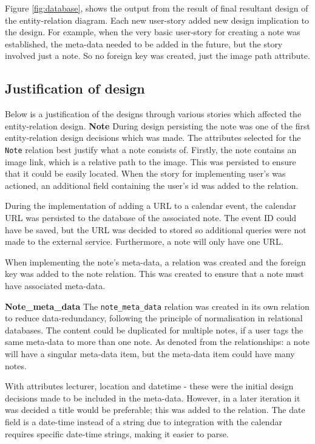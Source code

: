 Figure \ref{fig:database}, shows the output from the result of final resultant design of the entity-relation diagram. Each new user-story added new design implication to the design. For example, when the very basic user-story for creating a note was established, the meta-data needed to be added in the future, but the story involved just a note. So no foreign key was created, just the image path attribute.

\subsection{Justification of design}
Below is a justification of the designs through various stories which affected the entity-relation design.
\noindent
\textbf{Note}
\newline
During design persisting the note was one of the first entity-relation design decisions which was made. The attributes selected for the \texttt{Note} relation best justify what a note consists of. Firstly, the note contains an image link, which is a relative path to the image. This was persisted to ensure that it could be easily located. When the story for implementing user's was actioned, an additional field containing the user's id was added to the relation.

During the implementation of adding a URL to a calendar event, the calendar URL was persisted to the database of the associated note. The event ID could have be saved, but the URL was decided to stored so additional queries were not made to the external service. Furthermore, a note will only have one URL.

When implementing the note's meta-data, a relation was created and the foreign key was added to the note relation. This was created to ensure that a note must have associated meta-data.

\noindent
\textbf{Note\_meta\_data}
\newline
The \texttt{note\_meta\_data} relation was created in its own relation to reduce data-redundancy, following the principle of normalisation in relational databases. The content could be duplicated for multiple notes, if a user tags the same meta-data to more than one note. As denoted from the relationships: a note will have a singular meta-data item, but the meta-data item could have many notes.

With attributes lecturer, location and datetime - these were the initial design decisions made to be included in the meta-data. However, in a later iteration it was decided a title would be preferable; this was added to the relation. The date field is a date-time instead of a string due to integration with the calendar requires specific date-time strings, making it easier to parse.

